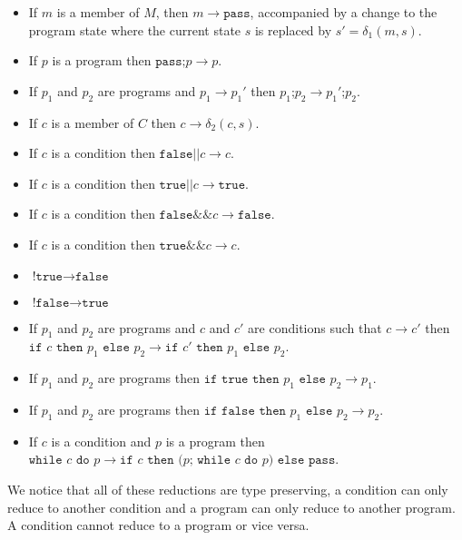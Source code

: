 \documentclass[11pt]{article}
\begin{document}
\begin{itemize}
\item If $m$ is a member of $M$, then $m \rightarrow \texttt{pass}$, accompanied by a change to the program state where the current state $s$ is replaced by $s' = \delta_{1}(m, s)$.
\item If $p$ is a program then $\texttt{pass;}p \rightarrow p$.
\item If $p_{1}$ and $p_{2}$ are programs and $p_{1} \rightarrow p_{1}'$ then $p_{1}\texttt{;}p_{2} \rightarrow p_{1}'\texttt{;}p_{2}$.

\item If $c$ is a member of $C$ then $c \rightarrow \delta_{2}(c, s)$.

\item If $c$ is a condition then $\texttt{false||} c \rightarrow c$.
\item If $c$ is a condition then $\texttt{true||} c \rightarrow \texttt{true}$.

\item If $c$ is a condition then $\texttt{false\&\&} c \rightarrow \texttt{false}$.
\item If $c$ is a condition then $\texttt{true\&\&} c \rightarrow c$.

\item $\texttt{!true} \rightarrow \texttt{false}$
\item $\texttt{!false} \rightarrow \texttt{true}$

\item If $p_{1}$ and $p_{2}$ are programs and $c$ and $c'$ are conditions such that $c \rightarrow c'$ then $\texttt{if } c \texttt{ then } p_{1} \texttt{ else } p_{2} \rightarrow \texttt{if } c' \texttt{ then } p_{1} \texttt{ else } p_{2}$.
\item If $p_{1}$ and $p_{2}$ are programs then $\texttt{if true then } p_{1} \texttt{ else } p_{2} \rightarrow p_{1}$.
\item If $p_{1}$ and $p_{2}$ are programs then $\texttt{if false then } p_{1} \texttt{ else } p_{2} \rightarrow p_{2}$.

\item If $c$ is a condition and $p$ is a program then $\texttt{while } c \texttt{ do } p \rightarrow \texttt{if } c \texttt{ then (} p \texttt{; while } c \texttt{ do } p \texttt{) else pass}$.
\end{itemize}

We notice that all of these reductions are type preserving, a condition can only reduce to another condition and a program can only reduce to another program.  A condition cannot reduce to a program or vice versa.
\end{document}
